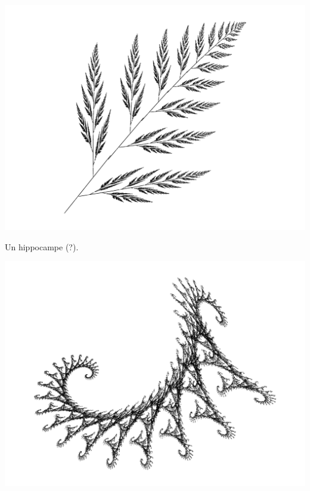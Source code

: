\documentclass[11pt,class=report,crop=false]{standalone}
\begin{document}
\begin{center}
\includegraphics[scale=\myscale,scale=0.6]{figures/ifs-05}
\end{center}

Un hippocampe (?). 
\begin{center}
\includegraphics[scale=\myscale,scale=0.6]{figures/ifs-06}
\end{center}
\end{document}

